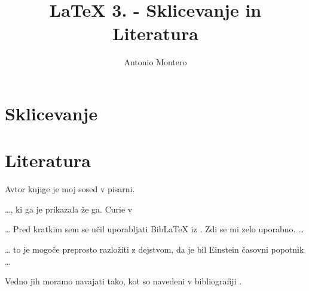 \documentclass{article}
\title{\LaTeX{} 3. - Sklicevanje in Literatura}
\author{Antonio Montero}
\begin{document}
\maketitle

\section*{Sklicevanje}
\label{sec:sklicevanje}




\section{Literatura}


\vspace{1cm}

Avtor knjige \cite{dm2018} je moj sosed v pisarni.


\ldots{}, ki ga je prikazala že ga. Curie
v \cite{curie}
\vspace{1cm}

\ldots{} Pred kratkim sem se učil uporabljati Bib\LaTeX{} iz \cite{lshort}. Zdi se mi zelo uporabno. \ldots
\vspace{1cm}

\ldots{} to je mogoče preprosto razložiti z
dejstvom, da je bil Einstein časovni
popotnik \cite{dream} \ldots
\vspace{1cm}

Vedno jih moramo navajati tako, kot so navedeni v bibliografiji \cite{dream, lshort, hp1, curie}.






\clearpage
\nocite{*}

\end{document}
